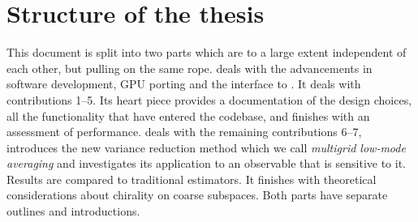 \section{Structure of the thesis}

This document is split into two parts which are to a large extent independent of each other, but pulling on the same rope.
 deals with the advancements in software development, GPU porting and the interface to \quda.
It deals with contributions \numrange{1}{5}.
Its heart piece provides a documentation of the design choices, all the functionality that have entered the codebase, and finishes with an assessment of performance.
 deals with the remaining contributions \numrange{6}{7}, introduces the new variance reduction method which we call \emph{multigrid low-mode averaging} and investigates its application to an observable that is sensitive to it.
Results are compared to traditional estimators.
It finishes with theoretical considerations about chirality on coarse subspaces.
Both parts have separate outlines and introductions.
